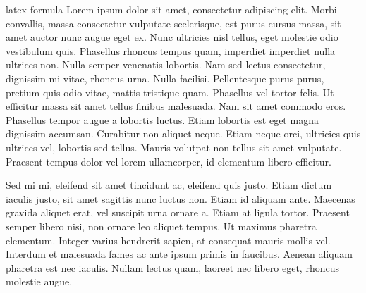 \gls{latex}
\Gls{formula}
Lorem ipsum dolor sit amet, consectetur adipiscing elit. Morbi convallis, massa consectetur vulputate scelerisque, est purus cursus massa, sit amet auctor nunc augue eget ex. Nunc ultricies nisl tellus, eget molestie odio vestibulum quis. Phasellus rhoncus tempus quam, imperdiet imperdiet nulla ultrices non. Nulla semper venenatis lobortis. Nam sed lectus consectetur, dignissim mi vitae, rhoncus urna. Nulla facilisi. Pellentesque purus purus, pretium quis odio vitae, mattis tristique quam. Phasellus vel tortor felis. Ut efficitur massa sit amet tellus finibus malesuada. Nam sit amet commodo eros. Phasellus tempor augue a lobortis luctus. Etiam lobortis est eget magna dignissim accumsan. Curabitur non aliquet neque. Etiam neque orci, ultricies quis ultrices vel, lobortis sed tellus. Mauris volutpat non tellus sit amet vulputate. Praesent tempus dolor vel lorem ullamcorper, id elementum libero efficitur.

Sed mi mi, eleifend sit amet tincidunt ac, eleifend quis justo. Etiam dictum iaculis justo, sit amet sagittis nunc luctus non. Etiam id aliquam ante. Maecenas gravida aliquet erat, vel suscipit urna ornare a. Etiam at ligula tortor. Praesent semper libero nisi, non ornare leo aliquet tempus. Ut maximus pharetra elementum. Integer varius hendrerit sapien, at consequat mauris mollis vel. Interdum et malesuada fames ac ante ipsum primis in faucibus. Aenean aliquam pharetra est nec iaculis. Nullam lectus quam, laoreet nec libero eget, rhoncus molestie augue.

